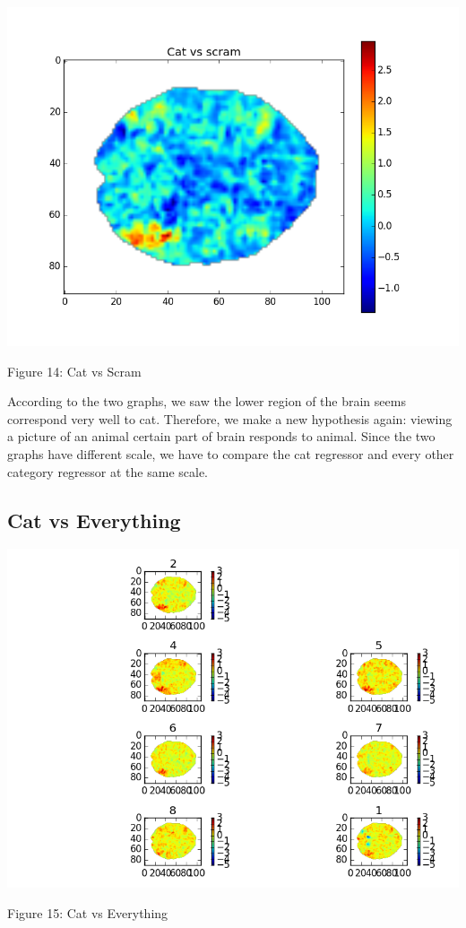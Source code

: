 \documentclass[12pt]{article}
\begin{document}
\begin{housevseverything}
\begin{housevseverything}
\begin{housevseverything}
    \centering
      \includegraphics{cat_vs_scram}
    \caption{Figure 14: Cat vs Scram}


\end{housevseverything}

According to the two graphs, we saw the lower region of the brain seems correspond very well to cat. Therefore, we make a new hypothesis again:  viewing a picture of an animal certain part of brain responds to animal. Since the two graphs have different scale, we have to compare the cat regressor and every other category regressor at the same scale.

\subsection{Cat vs Everything}



\begin{housevseverything}
    \centering
      \includegraphics[width=.8\textwidth]{cat_everything}
    \caption{Figure 15: Cat vs Everything}


\end{housevseverything}
\end{housevseverything}
\end{housevseverything}
\end{document}
